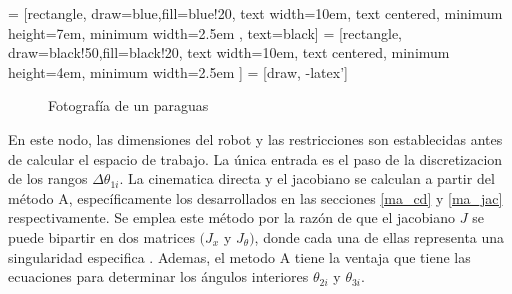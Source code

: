     
         = [rectangle, draw=blue,fill=blue!20, text width=10em, text centered, minimum height=7em, minimum width=2.5em , text=black]
         = [rectangle, draw=black!50,fill=black!20, text width=10em, text centered, minimum height=4em, minimum width=2.5em ]
         = [draw, -latex']
         \begin{center}
         \begin{figure}[htb]
                \caption{Fotografía de un paraguas}
                \label{f:Cap6_ws_1}
         \end{figure}
         \end{center}
         
        \vspace{-1cm}         
    
    En este nodo, las dimensiones del robot y las restricciones son establecidas antes de calcular el espacio de trabajo. La única entrada es el paso de la discretizacion de los rangos \(  \Delta  \theta _{1i} \). La cinematica directa y el jacobiano se calculan a partir del método A, específicamente los desarrollados en las secciones \ref{ma_cd} y \ref{ma_jac} respectivamente. Se emplea este método por la razón de que el jacobiano $J$ se puede bipartir en dos matrices $(J_{x}$  y  $J_{ \theta })$, donde cada una de ellas representa una singularidad especifica . Ademas, el metodo A tiene la ventaja que tiene las ecuaciones para determinar los ángulos interiores $\theta_{2i}$ y $\theta_{3i}$.
    
